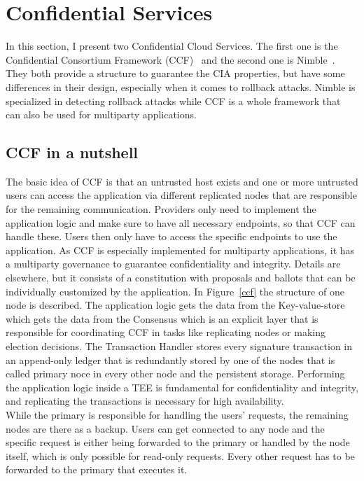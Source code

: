 \section{Confidential Services}
In this section, I present two Confidential Cloud Services. The first one is the Confidential Consortium Framework (CCF)~\cite{Howard} and the second one is Nimble~\cite{Nimble}. They both provide a structure to guarantee the CIA properties, but have some differences in their design, especially when it comes to rollback attacks. Nimble is specialized in detecting rollback attacks while CCF is a whole framework that can also be used for multiparty applications.

\subsection{CCF in a nutshell}
The basic idea of CCF is that an untrusted host exists and one or more untrusted users can access the application via different replicated nodes that are responsible for the remaining communication. Providers only need to implement the application logic and make sure to have all necessary endpoints, so that CCF can handle these. Users then only have to access the specific endpoints to use the application. As CCF is especially implemented for multiparty applications, it has a multiparty governance to guarantee confidentiality and integrity. Details are elsewhere, but it consists of a constitution with proposals and ballots that can be individually customized by the application. In Figure~\ref{ccf} the structure of one node is described. The application logic gets the data from the Key-value-store which gets the data from the Consensus which is an explicit layer that is responsible for coordinating CCF in tasks like replicating nodes or making election decisions.
  The Transaction Handler stores every signature transaction in an append-only ledger that is redundantly stored by one of the nodes that is called primary noce in every other node and the persistent storage. Performing the application logic inside a TEE is fundamental for confidentiality and integrity, and replicating the transactions is necessary for high availability.\\ %
While the primary is responsible for handling the users' requests, the remaining nodes are there as a backup. Users can get connected to any node and the specific request is either being forwarded to the primary or handled by the node itself, which is only possible for read-only requests. Every other request has to be forwarded to the primary that executes it.\\

